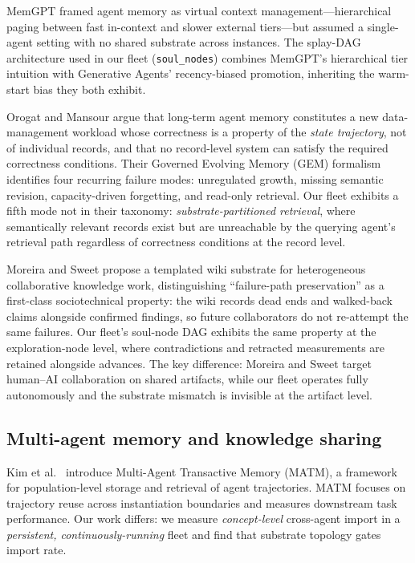 \documentclass[11pt]{article}
\begin{document}
MemGPT \citep{packer2023memgpt} framed agent memory as virtual context
management---hierarchical paging between fast in-context and slower external
tiers---but assumed a single-agent setting with no shared substrate across
instances. The splay-DAG architecture used in our fleet (\texttt{soul\_nodes})
combines MemGPT's hierarchical tier intuition with Generative Agents' recency-biased
promotion, inheriting the warm-start bias they both exhibit.

Orogat and Mansour \citep{orogat2026gem} argue that long-term agent memory
constitutes a new data-management workload whose correctness is a property of
the \emph{state trajectory}, not of individual records, and that no record-level
system can satisfy the required correctness conditions. Their Governed Evolving
Memory (GEM) formalism identifies four recurring failure modes: unregulated growth,
missing semantic revision, capacity-driven forgetting, and read-only retrieval. Our
fleet exhibits a fifth mode not in their taxonomy: \emph{substrate-partitioned
retrieval}, where semantically relevant records exist but are unreachable by the
querying agent's retrieval path regardless of correctness conditions at the record level.

Moreira and Sweet \citep{moreira2026templated} propose a templated wiki substrate
for heterogeneous collaborative knowledge work, distinguishing ``failure-path
preservation'' as a first-class sociotechnical property: the wiki records dead ends
and walked-back claims alongside confirmed findings, so future collaborators do not
re-attempt the same failures. Our fleet's soul-node DAG exhibits the same property
at the exploration-node level, where contradictions and retracted measurements are
retained alongside advances. The key difference: Moreira and Sweet target
human--AI collaboration on shared artifacts, while our fleet operates fully
autonomously and the substrate mismatch is invisible at the artifact level.

\subsection{Multi-agent memory and knowledge sharing}

Kim et al.\ \citep{kim2026matm} introduce Multi-Agent Transactive Memory (MATM),
a framework for population-level storage and retrieval of agent trajectories.
MATM focuses on trajectory reuse across instantiation boundaries and measures
downstream task performance. Our work differs: we measure \emph{concept-level}
cross-agent import in a \emph{persistent, continuously-running} fleet and find
that substrate topology gates import rate.
\end{document}
